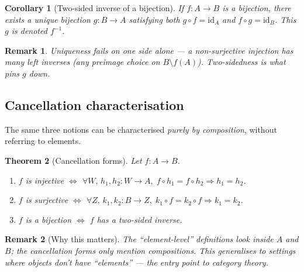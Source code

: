 \documentclass[11pt]{article}
\theoremstyle{defstyle}
\theoremstyle{thmstyle}
\newtheorem{theorem}{Theorem}[section]
\newtheorem{corollary}[theorem]{Corollary}
\theoremstyle{notstyle}
\newtheorem*{remark}{Remark}
\theoremstyle{cautionstyle}
\newcommand{\id}{\mathrm{id}}
\begin{document}
\begin{thmbox}
\begin{corollary}[Two-sided inverse of a bijection]
If $f \colon A \to B$ is a bijection, there exists a \emph{unique}
bijection $g \colon B \to A$ satisfying both $g \circ f = \id_A$ and
$f \circ g = \id_B$.  This $g$ is denoted $f^{-1}$.
\end{corollary}
\end{thmbox}

\begin{notebox}
\begin{remark}
Uniqueness fails on one side alone --- a non-surjective injection has
many left inverses (any preimage choice on $B \setminus f(A)$).
Two-sidedness is what pins $g$ down.
\end{remark}
\end{notebox}

\subsection{Cancellation characterisation}

The same three notions can be characterised \emph{purely by composition},
without referring to elements.

\begin{thmbox}
\begin{theorem}[Cancellation forms]
Let $f \colon A \to B$.
\begin{enumerate}[label=\textnormal{(\arabic*)}, leftmargin=2em, itemsep=2pt]
  \item $f$ is injective $\iff$ $\forall W,\, h_1, h_2 \colon W \to A,\;
        f \circ h_1 = f \circ h_2 \Rightarrow h_1 = h_2$.
  \item $f$ is surjective $\iff$ $\forall Z,\, k_1, k_2 \colon B \to Z,\;
        k_1 \circ f = k_2 \circ f \Rightarrow k_1 = k_2$.
  \item $f$ is a bijection $\iff$ $f$ has a two-sided inverse.
\end{enumerate}
\end{theorem}
\end{thmbox}

\begin{notebox}
\begin{remark}[Why this matters]
The ``element-level'' definitions look inside $A$ and $B$; the
cancellation forms only mention compositions.  This generalises to
settings where objects don't have ``elements'' --- the entry point to
category theory.
\end{remark}
\end{notebox}
\end{document}
